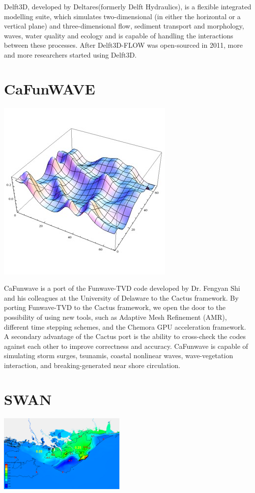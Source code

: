 \documentclass[letterpaper,10pt,openany, oneside]{sphinxmanual}
\begin{document}
Delft3D, developed by Deltares(formerly Delft Hydraulics), is a flexible integrated modelling suite, which simulates
two-dimensional (in either the horizontal or a vertical plane) and three-dimensional flow, sediment transport and
morphology, waves, water quality and ecology and is capable of handling the interactions between these processes.
After Delft3D-FLOW was open-sourced in 2011, more and more researchers started using Delft3D.


\section{CaFunWAVE}
\label{models:cafunwave}
\includegraphics{models_cafunwave.jpg}

CaFunwave is a port of the Funwave-TVD code developed by Dr. Fengyan Shi and his colleagues at the University of
Delaware to the Cactus framework. By porting Funwave-TVD to the Cactus framework, we open the door to the possibility
of using new tools, such as Adaptive Mesh Refinement (AMR), different time stepping schemes, and the Chemora GPU
acceleration framework. A secondary advantage of the Cactus port is the ability to cross-check the codes against
each other to improve correctness and accuracy. CaFunwave is capable of simulating storm surges, tsunamis,
coastal nonlinear waves, wave-vegetation interaction, and breaking-generated near shore circulation.


\section{SWAN}
\label{models:swan}
\includegraphics{models_swan.png}
\end{document}
